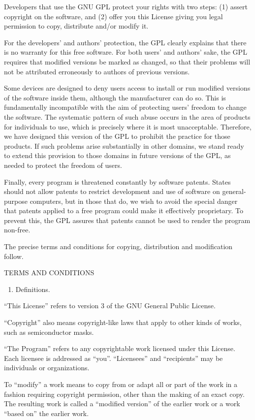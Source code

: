 \documentclass[11pt]{article}
\begin{document}
Developers that use the GNU GPL protect your rights with two steps: (1) assert copyright on the software, and (2) offer you this License giving you legal permission to copy, distribute and/or modify it.

For the developers' and authors' protection, the GPL clearly explains that there is no warranty for this free software. For both users' and authors' sake, the GPL requires that modified versions be marked as changed, so that their problems will not be attributed erroneously to authors of previous versions.

Some devices are designed to deny users access to install or run modified versions of the software inside them, although the manufacturer can do so. This is fundamentally incompatible with the aim of protecting users' freedom to change the software. The systematic pattern of such abuse occurs in the area of products for individuals to use, which is precisely where it is most unacceptable. Therefore, we have designed this version of the GPL to prohibit the practice for those products. If such problems arise substantially in other domains, we stand ready to extend this provision to those domains in future versions of the GPL, as needed to protect the freedom of users.

Finally, every program is threatened constantly by software patents. States should not allow patents to restrict development and use of software on general-purpose computers, but in those that do, we wish to avoid the special danger that patents applied to a free program could make it effectively proprietary. To prevent this, the GPL assures that patents cannot be used to render the program non-free.

The precise terms and conditions for copying, distribution and modification follow.

TERMS AND CONDITIONS
\begin{enumerate}
\item Definitions.
\end{enumerate}
“This License” refers to version 3 of the GNU General Public License.

“Copyright” also means copyright-like laws that apply to other kinds of works, such as semiconductor masks.

“The Program” refers to any copyrightable work licensed under this License. Each licensee is addressed as “you”. “Licensees” and “recipients” may be individuals or organizations.

To “modify” a work means to copy from or adapt all or part of the work in a fashion requiring copyright permission, other than the making of an exact copy. The resulting work is called a “modified version” of the earlier work or a work “based on” the earlier work.
\end{document}
